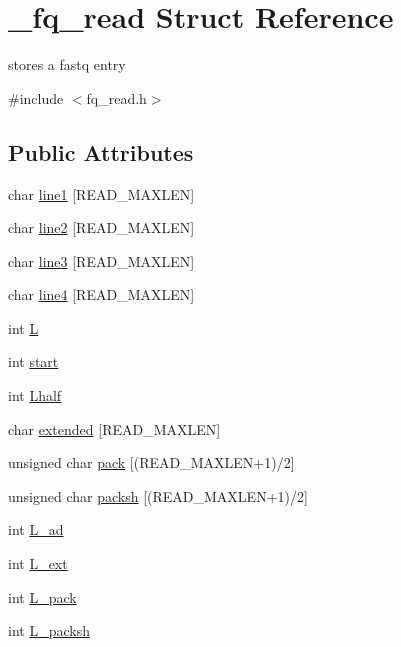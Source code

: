 \hypertarget{struct__fq__read}{}\section{\+\_\+fq\+\_\+read Struct Reference}
\label{struct__fq__read}


stores a fastq entry  




{\ttfamily \#include $<$fq\+\_\+read.\+h$>$}

\subsection*{Public Attributes}
\begin{DoxyCompactItemize}
\item 
char \mbox{\hyperlink{struct__fq__read_a7a643c49516b3a35f221d0fcda7f9ff3}{line1}} \mbox{[}R\+E\+A\+D\+\_\+\+M\+A\+X\+L\+EN\mbox{]}
\item 
char \mbox{\hyperlink{struct__fq__read_af2502a6f97e9508936c1b9f08890cc84}{line2}} \mbox{[}R\+E\+A\+D\+\_\+\+M\+A\+X\+L\+EN\mbox{]}
\item 
char \mbox{\hyperlink{struct__fq__read_a3df48e8dc31e47dc36c371002dba1bb5}{line3}} \mbox{[}R\+E\+A\+D\+\_\+\+M\+A\+X\+L\+EN\mbox{]}
\item 
char \mbox{\hyperlink{struct__fq__read_a8074fd734cb7e3d4b87454417aea569a}{line4}} \mbox{[}R\+E\+A\+D\+\_\+\+M\+A\+X\+L\+EN\mbox{]}
\item 
int \mbox{\hyperlink{struct__fq__read_a746efa9093b5223e85ffb7274e7693ef}{L}}
\item 
int \mbox{\hyperlink{struct__fq__read_a0b8deb6c25c72026b4928b17e3f12ade}{start}}
\item 
int \mbox{\hyperlink{struct__fq__read_a9cf08b81f1e78553e08fb597d30192b6}{Lhalf}}
\item 
char \mbox{\hyperlink{struct__fq__read_aae3ecb937cbba51f91baa391d8d84826}{extended}} \mbox{[}R\+E\+A\+D\+\_\+\+M\+A\+X\+L\+EN\mbox{]}
\item 
unsigned char \mbox{\hyperlink{struct__fq__read_afd023930012710b1a015ef78a02b3721}{pack}} \mbox{[}(R\+E\+A\+D\+\_\+\+M\+A\+X\+L\+EN+1)/2\mbox{]}
\item 
unsigned char \mbox{\hyperlink{struct__fq__read_a8c9786c5779078561abe5ec2e06c7ff9}{packsh}} \mbox{[}(R\+E\+A\+D\+\_\+\+M\+A\+X\+L\+EN+1)/2\mbox{]}
\item 
int \mbox{\hyperlink{struct__fq__read_a61c338fcae059e8581b02ec1b2cdcdc6}{L\+\_\+ad}}
\item 
int \mbox{\hyperlink{struct__fq__read_acf9a80768c42f71a975d602058e2ab52}{L\+\_\+ext}}
\item 
int \mbox{\hyperlink{struct__fq__read_a84f64405e7a9bbc055dd4f5534041782}{L\+\_\+pack}}
\item 
int \mbox{\hyperlink{struct__fq__read_a1303e633bdb4a7e31083d849a92fcbcc}{L\+\_\+packsh}}
\end{DoxyCompactItemize}


